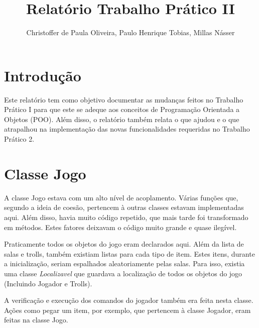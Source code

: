 \documentclass[runningheads,a4paper]{llncs}
\begin{document}
\mainmatter 

\title{Relatório Trabalho Prático II}


\author{Christoffer de Paula Oliveira, Paulo Henrique Tobias, Millas Násser}



\tocauthor{{}}

\maketitle

\medskip

\begingroup
\let\clearpage\relax
\tableofcontents
{}
\endgroup

\medskip
\medskip

\section*{Introdução}
    Este relatório tem como objetivo documentar as mudanças feitos no Trabalho Prático I para que este se adeque aos conceitos de Programação Orientada a Objetos (POO). Além disso, o relatório também relata o que ajudou e o que atrapalhou na implementação das novas funcionalidades requeridas no Trabalho Prático 2.

\section{Classe Jogo}
    A classe Jogo estava com um alto nível de acoplamento. Várias funções que, segundo a ideia de coesão, pertencem à outras classes estavam implementadas aqui. Além disso, havia muito código repetido, que mais tarde foi transformado em métodos. Estes fatores deixavam o código muito grande e quase ilegível.
    
    Praticamente todos os objetos do jogo eram declarados aqui. Além da lista de salas e trolls, também existiam listas para cada tipo de item. Estes itens, durante a inicialização, seriam espalhados aleatoriamente pelas salas. Para isso, existia uma classe \emph{Localizavel} que guardava a localização de todos os objetos do jogo (Incluindo Jogador e Trolls).

    A verificação e execução dos comandos do jogador também era feita nesta classe. Ações como pegar um item, por exemplo, que pertencem à classe Jogador, eram feitas na classe Jogo.
\end{document}
